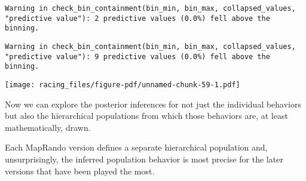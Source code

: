 \documentclass[
  letterpaper,
  DIV=11,
  numbers=noendperiod]{scrartcl}
\begin{document}
\begin{verbatim}
Warning in check_bin_containment(bin_min, bin_max, collapsed_values,
"predictive value"): 2 predictive values (0.0%) fell above the binning.
\end{verbatim}

\begin{verbatim}
Warning in check_bin_containment(bin_min, bin_max, collapsed_values,
"predictive value"): 9 predictive values (0.0%) fell above the binning.
\end{verbatim}

\texttt{[image: racing\_files/figure-pdf/unnamed-chunk-59-1.pdf]}

Now we can explore the posterior inferences for not just the individual
behaviors but also the hierarchical populations from which those
behaviors are, at least mathematically, drawn.

Each MapRando version defines a separate hierarchical population and,
unsurprisingly, the inferred population behavior is most precise for the
later versions that have been played the most.
\end{document}
